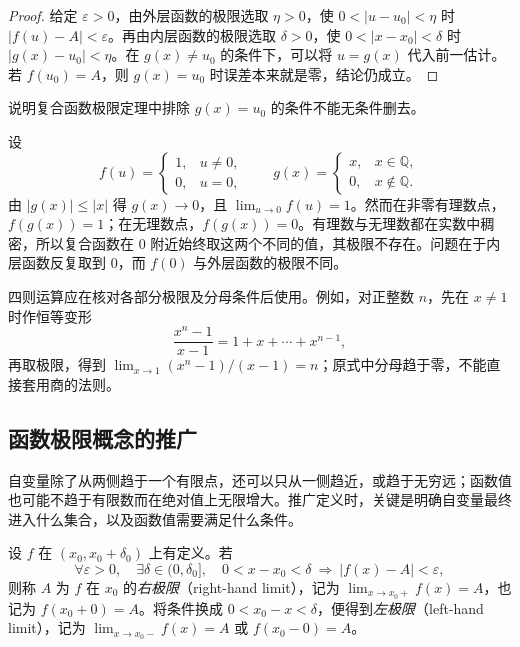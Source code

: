 \documentclass[UTF8,12pt,a4paper,fontset=fandol]{ctexbook}
\begin{document}
\begin{proof}
给定 $\varepsilon>0$，由外层函数的极限选取 $\eta>0$，使 $0<|u-u_0|<\eta$ 时 $|f(u)-A|<\varepsilon$。再由内层函数的极限选取 $\delta>0$，使 $0<|x-x_0|<\delta$ 时 $|g(x)-u_0|<\eta$。在 $g(x)\neq u_0$ 的条件下，可以将 $u=g(x)$ 代入前一估计。若 $f(u_0)=A$，则 $g(x)=u_0$ 时误差本来就是零，结论仍成立。
\end{proof}

\begin{example}
\label{ex:composition-limit-exception}
说明复合函数极限定理中排除 $g(x)=u_0$ 的条件不能无条件删去。
\end{example}

\begin{solve}
设
\[
    f(u)=\begin{cases}1,&u\neq0,\\0,&u=0,\end{cases}
    \qquad
    g(x)=\begin{cases}x,&x\in\mathbb{Q},\\0,&x\notin\mathbb{Q}.\end{cases}
\]
由 $|g(x)|\leq|x|$ 得 $g(x)\to0$，且 $\lim_{u\to0}f(u)=1$。然而在非零有理数点，$f(g(x))=1$；在无理数点，$f(g(x))=0$。有理数与无理数都在实数中稠密，所以复合函数在 $0$ 附近始终取这两个不同的值，其极限不存在。问题在于内层函数反复取到 $0$，而 $f(0)$ 与外层函数的极限不同。
\end{solve}

四则运算应在核对各部分极限及分母条件后使用。例如，对正整数 $n$，先在 $x\neq1$ 时作恒等变形
\[
    \frac{x^n-1}{x-1}=1+x+\cdots+x^{n-1},
\]
再取极限，得到 $\lim_{x\to1}(x^n-1)/(x-1)=n$；原式中分母趋于零，不能直接套用商的法则。

\subsection{函数极限概念的推广}
\label{subsec:generalizations-of-function-limits}

自变量除了从两侧趋于一个有限点，还可以只从一侧趋近，或趋于无穷远；函数值也可能不趋于有限数而在绝对值上无限增大。推广定义时，关键是明确自变量最终进入什么集合，以及函数值需要满足什么条件。

\begin{definition}
\label{def:one-sided-function-limits}
设 $f$ 在 $(x_0,x_0+\delta_0)$ 上有定义。若
\[
    \forall\varepsilon>0,\quad\exists\delta\in(0,\delta_0],\quad
    0<x-x_0<\delta\ \Longrightarrow\ |f(x)-A|<\varepsilon,
\]
则称 $A$ 为 $f$ 在 $x_0$ 的\emph{右极限}（right-hand limit），记为 $\lim_{x\to x_0+}f(x)=A$，也记为 $f(x_0+0)=A$。将条件换成 $0<x_0-x<\delta$，便得到\emph{左极限}（left-hand limit），记为 $\lim_{x\to x_0-}f(x)=A$ 或 $f(x_0-0)=A$。
\end{definition}
\end{document}
